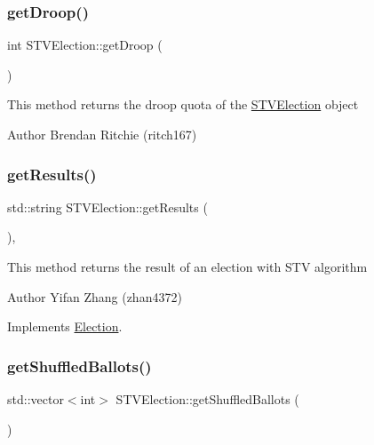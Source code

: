 \subsubsection{\texorpdfstring{get\+Droop()}{getDroop()}}
{\footnotesize\ttfamily int S\+T\+V\+Election\+::get\+Droop (\begin{DoxyParamCaption}{ }\end{DoxyParamCaption})}

This method returns the droop quota of the \hyperlink{classSTVElection}{S\+T\+V\+Election} object \begin{DoxyAuthor}{Author}
Brendan Ritchie (ritch167) 
\end{DoxyAuthor}
\mbox{\label{classSTVElection_ae7efa73091c87add327d71ff5f943c3c}} 
\subsubsection{\texorpdfstring{get\+Results()}{getResults()}}
{\footnotesize\ttfamily std\+::string S\+T\+V\+Election\+::get\+Results (\begin{DoxyParamCaption}{ }\end{DoxyParamCaption})\hspace{0.3cm}{\ttfamily [override]}, {\ttfamily [virtual]}}

This method returns the result of an election with S\+TV algorithm \begin{DoxyAuthor}{Author}
Yifan Zhang (zhan4372) 
\end{DoxyAuthor}


Implements \hyperlink{classElection_a6a6f4f301db86628b8d962281a19bf74}{Election}.

\mbox{\label{classSTVElection_a89e835eb11707dcba9f22a84c1d532f1}} 
\subsubsection{\texorpdfstring{get\+Shuffled\+Ballots()}{getShuffledBallots()}}
{\footnotesize\ttfamily std\+::vector$<$int$>$ S\+T\+V\+Election\+::get\+Shuffled\+Ballots (\begin{DoxyParamCaption}{ }\end{DoxyParamCaption})}

